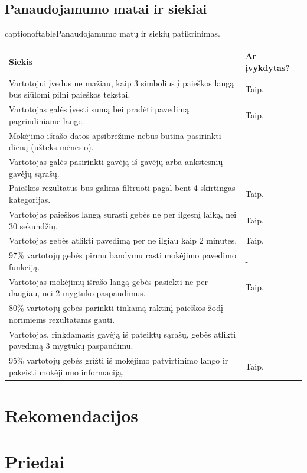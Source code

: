 \documentclass[oneside]{VUMIFPSkursinis}
\begin{document}
\subsection{Panaudojamumo matai ir siekiai}
\begin{center}
	captionof{table}{Panaudojamumo matų ir siekių patikrinimas.}
    \begin{tabular}{ |p{12cm}| p{3cm} |}
    \hline
	Siekis & Ar įvykdytas? \\ \hline
	Vartotojui įvedus ne mažiau, kaip 3 simbolius į paieškos langą bus siūlomi pilni paieškos tekstai. & Taip. \\ \hline
	Vartotojas galės įvesti sumą bei pradėti pavedimą pagrindiniame lange. & Taip. \\ \hline
	Mokėjimo išrašo datos apsibrėžime nebus būtina pasirinkti dieną (užteks mėnesio). & - \\ \hline
	Vartotojas galės pasirinkti gavėją iš gavėjų arba ankstesnių gavėjų sąrašų. & - \\ \hline
	Paieškos rezultatus bus galima filtruoti pagal bent 4 skirtingas kategorijas. & Taip. \\ \hline
	Vartotojas paieškos langą surasti gebės ne per ilgesnį laiką, nei 30 sekundžių. & Taip. \\ \hline
	Vartotojas gebės atlikti pavedimą per ne ilgiau kaip 2 minutes. & Taip. \\ \hline
	97\% vartotojų gebės pirmu bandymu rasti mokėjimo pavedimo funkciją. & - \\ \hline
	Vartotojas mokėjimų išrašo langą gebės pasiekti ne per daugiau, nei 2 mygtuko paspaudimus. & Taip. \\ \hline
	80\% vartotojų gebės parinkti tinkamą raktinį paieškos žodį norimiems rezultatams gauti. & - \\ \hline
	Vartotojas, rinkdamasis gavėją iš pateiktų sąrašų, gebės atlikti pavedimą 3 mygtukų paspaudimu. & - \\ \hline
	95\% vartotojų gebės grįžti iš mokėjimo patvirtinimo lango ir pakeisti mokėjiumo informaciją. & Taip. \\ \hline

    \end{tabular}
\end{center}
\section{Rekomendacijos}
\section{Priedai}
\end{document}
